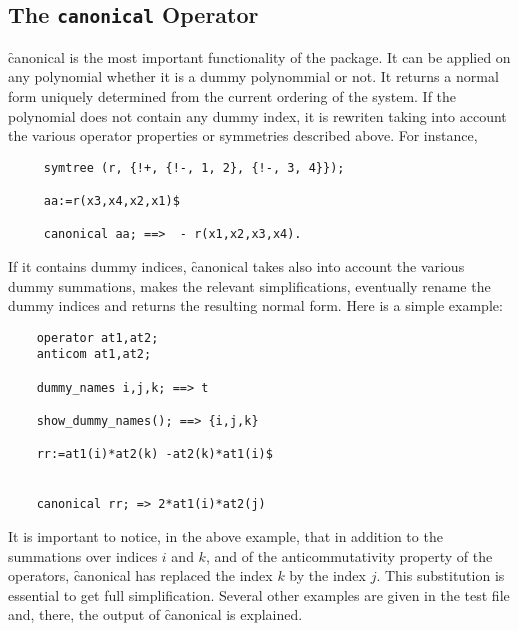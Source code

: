 \subsection{The \texttt{canonical} Operator}
\hypertarget{operator:CANONICAL}{}
\f{canonical} is the most important functionality of the package.
It can be applied on any polynomial whether it is a dummy polynommial 
or not. It returns a normal form uniquely determined 
from the current ordering of the system.  
If the polynomial does not contain any dummy index, it is rewriten
taking into account the various operator properties or symmetries described 
above.
For instance, 
\begin{verbatim}
     symtree (r, {!+, {!-, 1, 2}, {!-, 3, 4}});

     aa:=r(x3,x4,x2,x1)$

     canonical aa; ==>  - r(x1,x2,x3,x4).
\end{verbatim}
If it contains dummy indices, \f{canonical} takes also into account the 
various dummy summations, makes the relevant simplifications, 
eventually rename the dummy indices  and returns the resulting normal form.
Here is a simple example:
\begin{verbatim}
    operator at1,at2;
    anticom at1,at2;

    dummy_names i,j,k; ==> t

    show_dummy_names(); ==> {i,j,k}

    rr:=at1(i)*at2(k) -at2(k)*at1(i)$
                     

    canonical rr; => 2*at1(i)*at2(j)
\end{verbatim}
It is important to notice, in the above example, that in addition to 
the summations over indices $i$ and $k$, and of the anticommutativity 
property of the operators, \f{canonical} has replaced the index $k$
by the index $j$. This substitution is essential to get full simplification.
Several other examples are given in the test file and, there, the output
of \f{canonical} is explained.   

